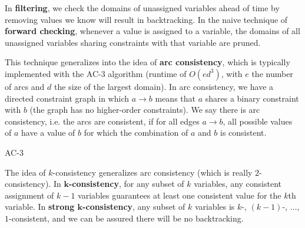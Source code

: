 \documentclass[12pt]{article}
\begin{document}
In \textbf{filtering}, we check the domains of unassigned variables ahead of time by removing values we know will result in backtracking. In the naive technique of \textbf{forward checking}, whenever a value is assigned to a variable, the domains of all unassigned variables sharing constraints with that variable are pruned.

This technique generalizes into the idea of \textbf{arc consistency}, which is typically implemented with the AC-3 algorithm (runtime of $O(ed^3)$, with $e$ the number of arcs and $d$ the size of the largest domain). In arc consistency, we have a directed constraint graph in which $a \to b$ means that $a$ shares a binary constraint with $b$ (the graph has no higher-order constraints). We say there is arc consistency, i.e. the arcs are consistent, if for all edges $a \to b$, all possible values of $a$ have a value of $b$ for which the combination of $a$ and $b$ is consistent.
\begin{algorithm}[h]
\caption{AC-3}



\end{algorithm}

The idea of $k$-consistency generalizes arc consistency (which is really $2$-consistency). In \textbf{$\mathbf{k}$-consistency}, for any subset of $k$ variables, any consistent assignment of $k - 1$ variables guarantees at least one consistent value for the $k$th variable. In \textbf{strong $\mathbf{k}$-consistency}, any subset of $k$ variables is $k$-, $(k - 1)$-, $\ldots$, $1$-consistent, and we can be assured there will be no backtracking.
\end{document}
